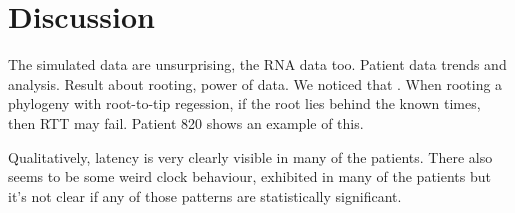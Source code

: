 \section{Discussion} \label{sec:discuss}
The simulated data are unsurprising, the RNA data too. Patient data trends and analysis. Result about rooting, power of data.
We noticed that . When rooting a phylogeny with root-to-tip regession, if the root lies behind the known times, then RTT may fail. Patient 820 shows an example of this.

Qualitatively, latency is very clearly visible in many of the patients. There also seems to be some weird clock behaviour, exhibited in many of the patients but it’s not clear if any of those patterns are statistically significant. 
